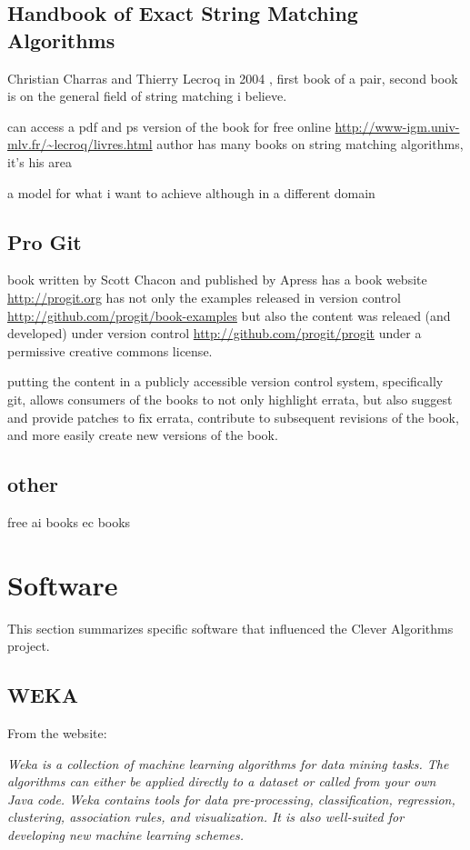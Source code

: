 \documentclass[a4paper, 11pt]{article}
\begin{document}
\subsection{Handbook of Exact String Matching Algorithms}
Christian Charras and Thierry Lecroq in 2004 \cite{Charras2004}, first book of a pair, second book is on the general field of string matching i believe.

can access a pdf and ps version of the book for free online \url{http://www-igm.univ-mlv.fr/~lecroq/livres.html}
author has many books on string matching algorithms, it's his area 

a model for what i want to achieve although in a different domain


\subsection{Pro Git}
book written by Scott Chacon and published by Apress \cite{Chacon2009}
has a book website \url{http://progit.org}
has not only the examples released in version control \url{http://github.com/progit/book-examples} but also the content was releaed (and developed) under version control \url{http://github.com/progit/progit} under a permissive creative commons license. 

putting the content in a publicly accessible version control system, specifically git, allows consumers of the books to not only highlight errata, but also suggest and provide patches to fix errata, contribute to subsequent revisions of the book, and more easily create new versions of the book.

\subsection{other}
free ai books
ec books


\section{Software}
\label{sec:software}
This section summarizes specific software that influenced the Clever Algorithms project.

\subsection{WEKA}
From the website: 

\emph{Weka is a collection of machine learning algorithms for data mining tasks. The algorithms can either be applied directly to a dataset or called from your own Java code. Weka contains tools for data pre-processing, classification, regression, clustering, association rules, and visualization. It is also well-suited for developing new machine learning schemes.}
\end{document}
